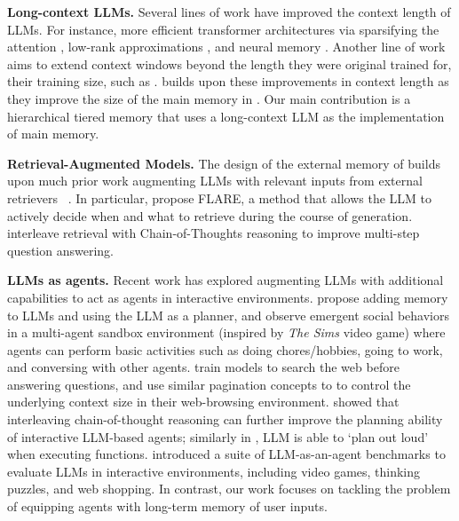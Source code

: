 
\textbf{Long-context LLMs.}
Several lines of work have improved the context length of LLMs. For instance, more efficient transformer architectures via sparsifying the attention \citep{child2019generating, beltagy2020longformer}, low-rank approximations \citep{wang2020linformer}, and neural memory \cite{lee2019set}. Another line of work aims to extend context windows beyond the length they were original trained for, their training size, such as \citet{alibi, chen2023extending}. \ours builds upon these improvements in context length as they improve the size of the main memory in \ours. Our main contribution is a hierarchical tiered memory that uses a long-context LLM as the implementation of main memory.

\textbf{Retrieval-Augmented Models.}
The design of the external memory of \ours builds upon much prior work augmenting LLMs with relevant inputs from external retrievers ~\cite{ram2023context, retro, fb-dense-retrieval, lewis2020retrieval, guu2020retrieval, radit}. In particular, \citet{jiang2023active} propose FLARE, a method that allows the LLM to actively decide when and what to retrieve during the course of generation.  \citet{Trivedi2022InterleavingRW} interleave retrieval with Chain-of-Thoughts reasoning to improve multi-step question answering. 


\textbf{LLMs as agents.}
Recent work has explored augmenting LLMs with additional capabilities to act as agents in interactive environments. 
\citet{park2023simulacra} propose adding memory to LLMs and using the LLM as a planner, and observe emergent social behaviors in a multi-agent sandbox environment (inspired by \emph{The Sims} video game) where agents can perform basic activities such as doing chores/hobbies, going to work, and conversing with other agents.
\citet{nakano2021webgpt} train models to search the web before answering questions, and use similar pagination concepts to \ours to control the underlying context size in their web-browsing environment. 
\citet{yao2022react} showed that interleaving chain-of-thought reasoning \citep{wei2022chainofthought} can further improve the planning ability of interactive LLM-based agents; similarly in \ours, LLM is able to `plan out loud' when executing functions. %
\citet{liu2023agentbench} introduced a suite of LLM-as-an-agent benchmarks to evaluate LLMs in interactive environments, including video games, thinking puzzles, and web shopping. 
In contrast, our work focuses on tackling the problem of equipping agents with long-term memory of user inputs.


